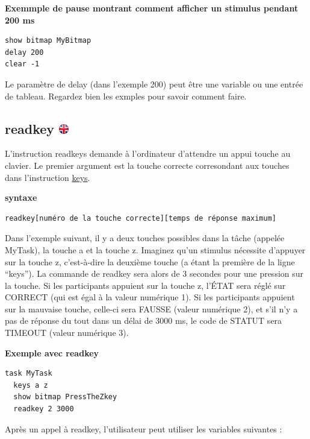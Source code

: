 \documentclass[
]{book}
\begin{document}
\textbf{Exemmple de pause montrant comment afficher un stimulus pendant 200 ms}

\begin{verbatim}
show bitmap MyBitmap
delay 200
clear -1
\end{verbatim}

Le paramètre de delay (dans l'exemple 200) peut être une variable ou une entrée de tableau. Regardez bien les exmples pour savoir comment faire.

\hypertarget{readkey}{%
\subsection[readkey ]{\texorpdfstring{readkey \href{https://www.psytoolkit.org/doc3.2.0/syntax.html\#task-readkey}{\protect\includegraphics{img/ukflag.png}}}{readkey }}\label{readkey}}

L'instruction readkeys demande à l'ordinateur d'attendre un appui touche au clavier. Le premier argument est la touche correcte corresondant aux touches dans l'instruction \protect\hyperlink{keys}{keys}.

\textbf{syntaxe}

\begin{verbatim}
readkey[numéro de la touche correcte][temps de réponse maximum]
\end{verbatim}

Dans l'exemple suivant, il y a deux touches possibles dans la tâche (appelée MyTask), la touche a et la touche z. Imaginez qu'un stimulus nécessite d'appuyer sur la touche z, c'est-à-dire la deuxième touche (a étant la première de la ligne ``keys''). La commande de readkey sera alors de 3 secondes pour une pression sur la touche. Si les participants appuient sur la touche z, l'ÉTAT sera réglé sur CORRECT (qui est égal à la valeur numérique 1). Si les participants appuient sur la mauvaise touche, celle-ci sera FAUSSE (valeur numérique 2), et s'il n'y a pas de réponse du tout dans un délai de 3000 ms, le code de STATUT sera TIMEOUT (valeur numérique 3).

\textbf{Exemple avec readkey}

\begin{verbatim}
task MyTask
  keys a z
  show bitmap PressTheZkey
  readkey 2 3000
\end{verbatim}

Après un appel à readkey, l'utilisateur peut utiliser les variables suivantes :
\end{document}
